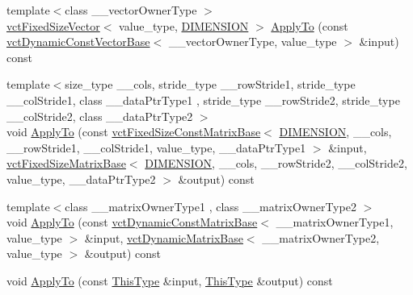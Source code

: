 \begin{DoxyCompactItemize}
\item 
{\footnotesize template$<$class \+\_\+\+\_\+vector\+Owner\+Type $>$ }\\\hyperlink{classvct_fixed_size_vector}{vct\+Fixed\+Size\+Vector}$<$ value\+\_\+type, \hyperlink{classvct_quaternion_rotation3_base_a729ac03acdd5949ecf382629e563d2a0a9417132a8a6849e18439d903ae6a1f18}{D\+I\+M\+E\+N\+S\+I\+O\+N} $>$ \hyperlink{classvct_quaternion_rotation3_base_a325b9b7a00977944710e138d9f9fa672}{Apply\+To} (const \hyperlink{classvct_dynamic_const_vector_base}{vct\+Dynamic\+Const\+Vector\+Base}$<$ \+\_\+\+\_\+vector\+Owner\+Type, value\+\_\+type $>$ \&input) const 
\item 
{\footnotesize template$<$size\+\_\+type \+\_\+\+\_\+cols, stride\+\_\+type \+\_\+\+\_\+row\+Stride1, stride\+\_\+type \+\_\+\+\_\+col\+Stride1, class \+\_\+\+\_\+data\+Ptr\+Type1 , stride\+\_\+type \+\_\+\+\_\+row\+Stride2, stride\+\_\+type \+\_\+\+\_\+col\+Stride2, class \+\_\+\+\_\+data\+Ptr\+Type2 $>$ }\\void \hyperlink{classvct_quaternion_rotation3_base_a9e7293a9906d19ad13033c32ba2a54e2}{Apply\+To} (const \hyperlink{classvct_fixed_size_const_matrix_base}{vct\+Fixed\+Size\+Const\+Matrix\+Base}$<$ \hyperlink{classvct_quaternion_rotation3_base_a729ac03acdd5949ecf382629e563d2a0a9417132a8a6849e18439d903ae6a1f18}{D\+I\+M\+E\+N\+S\+I\+O\+N}, \+\_\+\+\_\+cols, \+\_\+\+\_\+row\+Stride1, \+\_\+\+\_\+col\+Stride1, value\+\_\+type, \+\_\+\+\_\+data\+Ptr\+Type1 $>$ \&input, \hyperlink{classvct_fixed_size_matrix_base}{vct\+Fixed\+Size\+Matrix\+Base}$<$ \hyperlink{classvct_quaternion_rotation3_base_a729ac03acdd5949ecf382629e563d2a0a9417132a8a6849e18439d903ae6a1f18}{D\+I\+M\+E\+N\+S\+I\+O\+N}, \+\_\+\+\_\+cols, \+\_\+\+\_\+row\+Stride2, \+\_\+\+\_\+col\+Stride2, value\+\_\+type, \+\_\+\+\_\+data\+Ptr\+Type2 $>$ \&output) const 
\item 
{\footnotesize template$<$class \+\_\+\+\_\+matrix\+Owner\+Type1 , class \+\_\+\+\_\+matrix\+Owner\+Type2 $>$ }\\void \hyperlink{classvct_quaternion_rotation3_base_a1c2f9b5a6e94fd4fc1c29ab5e1d35802}{Apply\+To} (const \hyperlink{classvct_dynamic_const_matrix_base}{vct\+Dynamic\+Const\+Matrix\+Base}$<$ \+\_\+\+\_\+matrix\+Owner\+Type1, value\+\_\+type $>$ \&input, \hyperlink{classvct_dynamic_matrix_base}{vct\+Dynamic\+Matrix\+Base}$<$ \+\_\+\+\_\+matrix\+Owner\+Type2, value\+\_\+type $>$ \&output) const 
\item 
void \hyperlink{classvct_quaternion_rotation3_base_aca00b347c8b13aa531ee7e433a009494}{Apply\+To} (const \hyperlink{classvct_quaternion_base_af28efdc38acf89acb7a67afada11408c}{This\+Type} \&input, \hyperlink{classvct_quaternion_base_af28efdc38acf89acb7a67afada11408c}{This\+Type} \&output) const 

\end{DoxyCompactItemize}
